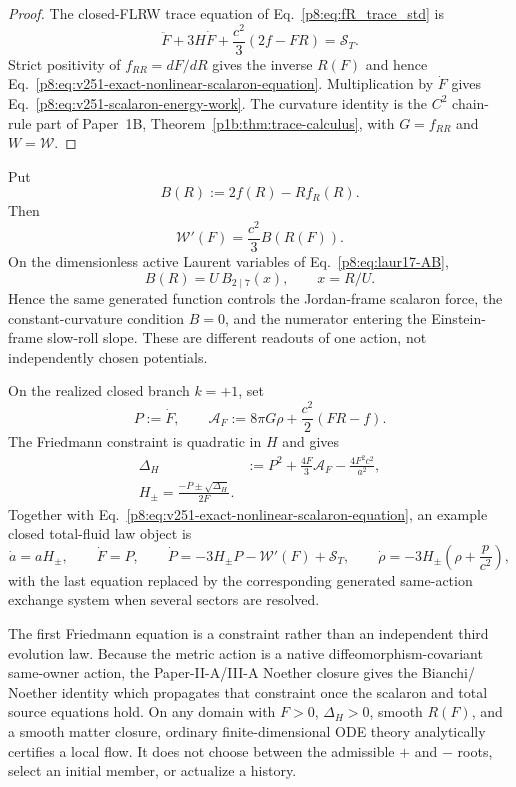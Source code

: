 \documentclass[12pt,a4paper]{article}
\begin{document}
\begin{proof}
The closed-FLRW trace equation of
Eq.~\eqref{p8:eq:fR_trace_std} is
\[
 \ddot F+3H\dot F+\frac{c^2}{3}(2f-FR)=\mathcal S_T.
\]
Strict positivity of \(f_{RR}=dF/dR\) gives the inverse \(R(F)\) and hence
Eq.~\eqref{p8:eq:v251-exact-nonlinear-scalaron-equation}.  Multiplication by
\(\dot F\) gives Eq.~\eqref{p8:eq:v251-scalaron-energy-work}.
The curvature identity is the \(C^2\) chain-rule part of Paper~1B,
Theorem~\ref{p1b:thm:trace-calculus}, with \(G=f_{RR}\) and \(W=\mathcal W\).
\end{proof}

\begin{corollary}
\label{p8:cor:v251-common-force-numerator}
Put
\[
 B(R):=2f(R)-Rf_R(R).
\]
Then
\[
 \boxed{\mathcal W'(F)=\frac{c^2}{3}B(R(F)).}
\]
On the dimensionless active Laurent variables of
Eq.~\eqref{p8:eq:laur17-AB},
\[
 B(R)=U\,B_{2\mid7}(x),
 \qquad x=R/U.
\]
Hence the same generated function controls the Jordan-frame scalaron force,
the constant-curvature condition \(B=0\), and the numerator entering the
Einstein-frame slow-roll slope.  These are different readouts of one action,
not independently chosen potentials.
\end{corollary}

\begin{theorem}
\label{p8:thm:v251-constrained-scalaron-generator}
On the realized closed branch \(k=+1\), set
\[
 P:=\dot F,
 \qquad
 \mathcal A_F:=8\pi G\rho+\frac{c^2}{2}(FR-f).
\]
The Friedmann constraint is quadratic in \(H\) and gives
\begin{align}
\label{p8:eq:v251-friedmann-discriminant}
 \Delta_H
 &:=P^2+\frac{4F}{3}\mathcal A_F
       -\frac{4F^2c^2}{a^2},\\
\label{p8:eq:v251-friedmann-roots}
 \boxed{
 H_\pm
 =\frac{-P\pm\sqrt{\Delta_H}}{2F}.}
\end{align}
Together with Eq.~\eqref{p8:eq:v251-exact-nonlinear-scalaron-equation}, an
example closed total-fluid law object is
\begin{equation}
\label{p8:eq:v251-first-order-scalaron-flow}
 \boxed{
 \dot a=aH_\pm,
 \qquad
 \dot F=P,
 \qquad
 \dot P=-3H_\pm P-\mathcal W'(F)+\mathcal S_T,
 \qquad
 \dot\rho=-3H_\pm\left(\rho+\frac{p}{c^2}\right),}
\end{equation}
with the last equation replaced by the corresponding generated same-action
exchange system when several sectors are resolved.

The first Friedmann equation is a constraint rather than an independent third
evolution law.  Because the metric action is a native diffeomorphism-covariant
same-owner action, the Paper-II-A/III-A Noether closure gives the Bianchi/
Noether identity which propagates that constraint once the scalaron and total
source equations hold.  On any domain with \(F>0\), \(\Delta_H>0\), smooth
\(R(F)\), and a smooth matter closure, ordinary finite-dimensional ODE theory
analytically certifies a local flow.  It does not choose between the admissible
\(+\) and \(-\) roots, select an initial member, or actualize a history.
\end{theorem}
\end{document}
